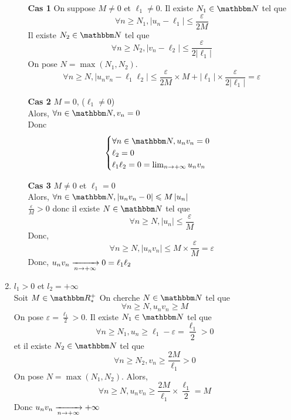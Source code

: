 \begin{prv}
\begin{enumerate}
			\begin{itemize}
				\item[\sc \bf Cas 1] On suppose $M\neq  0$ et $\ell_1\neq  0$. Il existe $N_1\in \N$ tel que \[
				\forall n \ge  N_1, \left| u_n- \ell_1 \right| \le  \frac{\varepsilon}{2M}
				\] Il existe $N_2\in \N$ tel que \[
				\forall n\ge N_2, \left| v_n-\ell_2 \right| \le \frac{\varepsilon}{2\left| \ell_1 \right| }
				\] On pose $N = \max(N_1, N_2)$.\[
				\forall n \ge N, \left| u_nv_n-\ell_1\ell_2 \right| \le \frac{\varepsilon}{2M} \times M + \left| \ell_1 \right| \times \frac{\varepsilon}{2\left| \ell_1 \right| } = \varepsilon
				\]
			\item[\sc \bf Cas 2] $M = 0$, ($\ell_1\neq 0$)\\
				Alors, $\forall n\in \N, v_n = 0$ \\
				Donc \[
				\begin{cases} 
					\forall n \in \N, u_nv_n = 0\\
					\ell_2=0\\
					\ell_1\ell_2 = 0 = \lim_{n \to  +\infty} u_nv_n
				\end{cases}
				\] 
			\item[\sc\bf Cas 3] $M \neq 0$ et $\ell_1=0$\\
				Alors, $\forall n \in \N, \left| u_nv_n-0 \right| \le  M \left| u_n \right| $ \\
				$\frac{\varepsilon}{M}>0$ donc il existe $N \in \N$ tel que  \[
				\forall  n\ge N, \left| u_n \right|  \le \frac{\varepsilon}{M}
				\] Donc, \[
				\forall n \ge  N, \left| u_nv_n \right| \le  M \times \frac{\varepsilon}{M}= \varepsilon
				\] Donc, $u_nv_n \xrightarrow[n \to +\infty]{} 0 = \ell_1\ell_2$
			\end{itemize}
		\item $l_1>0$ et $l_2=+\infty$\\
			Soit $M \in \R^+_*$ On cherche $N \in \N$ tel que \[
			\forall n \ge  N, u_nv_n \ge M
			\] On pose $\varepsilon = \frac{\ell_1}{2} > 0$. Il existe $N_1\in \N$ tel que \[
			\forall n\ge  N_1, u_n \ge  \ell_1-\varepsilon=\frac{\ell_1}{2}>0
			\] et il existe $N_2 \in \N$ tel que \[
			\forall n \ge  N_2, v_n \ge \frac{2M}{\ell_1}>0
			\]
			On pose $N = \max(N_1,N_2)$. Alors, \[
			\forall n\ge N, u_nv_n\ge  \frac{2M}{\ell_1} \times  \frac{\ell_1}{2} = M
			\]
			Donc $u_nv_n\xrightarrow[n \to  +\infty]{} +\infty$
	\end{enumerate}
\end{prv}


